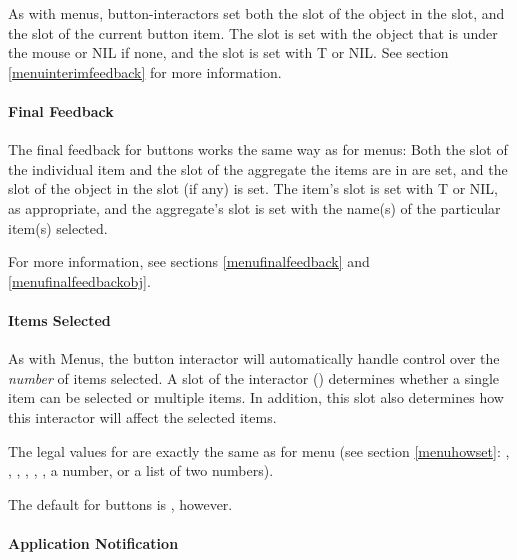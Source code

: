 As with menus, button-interactors set both the  slot of
the object in the  slot, and the 
slot of the current button item.  The  slot is set with the
object that is under the mouse or NIL if none, and the
 slot is set with T or NIL.  See section
\ref{menuinterimfeedback} for more information.

\paragraph{Final Feedback}
\label{buttonfinalfeedback}

The final feedback for buttons works the same way as for menus:
Both the  slot of the
individual item and the  slot of the aggregate
the items are in are set, and the  slot of the object in the
 slot (if any) is set.
The item's  slot is set with T or NIL, as
appropriate, and the aggregate's  slot is set with the
name(s) of the particular item(s) selected.

For more information, see sections \ref{menufinalfeedback} and
\ref{menufinalfeedbackobj}.

\paragraph{Items Selected}
\label{buttonhowset}

As with Menus, the button interactor will automatically handle control over
the {\it number}
of items selected.  A slot of the interactor () determines
whether a single item can be selected or multiple items.  In addition, this
slot also determines how this interactor will affect the selected items.

The legal values for  are exactly the same as for menu (see
section \ref{menuhowset}:
, , , , ,
, a number, or a list of two numbers).

The default for buttons is , however.


\paragraph{Application Notification}
\label{buttonfinalfunc}

